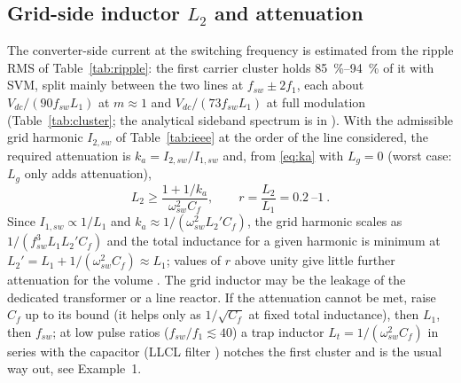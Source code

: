 \documentclass[10pt,a4paper]{scrartcl}
\newcommand{\Vdc}{V_{dc}}
\newcommand{\fsw}{f_{sw}}
\newcommand{\wsw}{\omega_{sw}}
\newcommand{\Cf}{C_{f}}
\newcommand{\Lg}{L_{g}}
\begin{document}
\begin{onehalfspace}
\subsection{Grid-side inductor $L_2$ and attenuation}
The converter-side current at the switching frequency is estimated from the ripple RMS of Table~\ref{tab:ripple}: the first carrier cluster holds \SIrange{85}{94}{\percent} of it with SVM, split mainly between the two lines at $\fsw \pm 2f_1$, each about $\Vdc/(90\fsw L_1)$ at $m \approx 1$ and $\Vdc/(73\fsw L_1)$ at full modulation (Table~\ref{tab:cluster}; the analytical sideband spectrum is in \cite{holmes2003}). With the admissible grid harmonic $I_{2,sw}$ of Table~\ref{tab:ieee} at the order of the line considered, the required attenuation is $k_a = I_{2,sw}/I_{1,sw}$ and, from \eqref{eq:ka} with $\Lg = 0$ (worst case: $\Lg$ only adds attenuation),
\begin{equation}
L_2 \ge \frac{1 + 1/k_a}{\wsw^2 \Cf},\qquad r = \frac{L_2}{L_1} = \SIrange{0.2}{1}{}.
\label{eq:L2}
\end{equation}
Since $I_{1,sw} \propto 1/L_1$ and $k_a \approx 1/(\wsw^2 L_2' \Cf)$, the grid harmonic scales as $1/(\fsw^3 L_1 L_2' \Cf)$ and the total inductance for a given harmonic is minimum at $L_2' = L_1 + 1/(\wsw^2\Cf) \approx L_1$; values of $r$ above unity give little further attenuation for the volume \cite{liserre2005,jalili2009}. The grid inductor may be the leakage of the dedicated transformer or a line reactor. If the attenuation cannot be met, raise $\Cf$ up to its bound (it helps only as $1/\sqrt{\Cf}$ at fixed total inductance), then $L_1$, then $\fsw$; at low pulse ratios ($\fsw/f_1 \lesssim 40$) a trap inductor $L_t = 1/(\wsw^2\Cf)$ in series with the capacitor (LLCL filter \cite{wu2012}) notches the first cluster and is the usual way out, see Example~1.


\end{onehalfspace}
\end{document}
